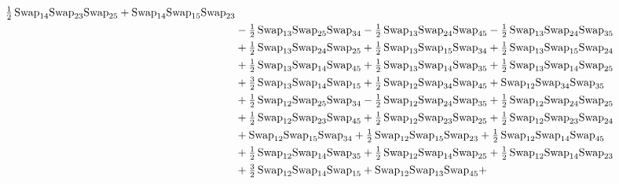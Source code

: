 \documentclass[12pt,dvipsnames,accepted=2016-08-18,a4paper,onecolumn]{quantumarticle}
\numberwithin{equation}{section}
\theoremstyle{definition}
\begin{document}
\begin{align*}
        \tfrac12\,\textnormal{Swap}_{14} \textnormal{Swap}_{23} \textnormal{Swap}_{25} + \textnormal{Swap}_{14} \textnormal{Swap}_{15} \textnormal{Swap}_{23} \\ & - \tfrac12\,\textnormal{Swap}_{13} \textnormal{Swap}_{25} \textnormal{Swap}_{34} - \tfrac12\,\textnormal{Swap}_{13} \textnormal{Swap}_{24} \textnormal{Swap}_{45} -
        \tfrac12\,\textnormal{Swap}_{13} \textnormal{Swap}_{24} \textnormal{Swap}_{35}\\ & + \tfrac12\,\textnormal{Swap}_{13} \textnormal{Swap}_{24} \textnormal{Swap}_{25} + \tfrac12\,\textnormal{Swap}_{13} \textnormal{Swap}_{15} \textnormal{Swap}_{34} + \tfrac12\,\textnormal{Swap}_{13} \textnormal{Swap}_{15} \textnormal{Swap}_{24}\\ & +
        \tfrac12\,\textnormal{Swap}_{13} \textnormal{Swap}_{14} \textnormal{Swap}_{45} + \tfrac12\,\textnormal{Swap}_{13} \textnormal{Swap}_{14} \textnormal{Swap}_{35} + \tfrac12\,\textnormal{Swap}_{13} \textnormal{Swap}_{14} \textnormal{Swap}_{25}\\ & + \tfrac32\,\textnormal{Swap}_{13} \textnormal{Swap}_{14} \textnormal{Swap}_{15} +
        \tfrac12\,\textnormal{Swap}_{12} \textnormal{Swap}_{34} \textnormal{Swap}_{45} + \textnormal{Swap}_{12} \textnormal{Swap}_{34} \textnormal{Swap}_{35}\\ & + \tfrac12\,\textnormal{Swap}_{12} \textnormal{Swap}_{25} \textnormal{Swap}_{34} - \tfrac12\,\textnormal{Swap}_{12} \textnormal{Swap}_{24} \textnormal{Swap}_{35} +
        \tfrac12\,\textnormal{Swap}_{12} \textnormal{Swap}_{24} \textnormal{Swap}_{25}\\ & + \tfrac12\,\textnormal{Swap}_{12} \textnormal{Swap}_{23} \textnormal{Swap}_{45} + \tfrac12\,\textnormal{Swap}_{12} \textnormal{Swap}_{23} \textnormal{Swap}_{25} + \tfrac12\,\textnormal{Swap}_{12} \textnormal{Swap}_{23} \textnormal{Swap}_{24}\\ & +
        \textnormal{Swap}_{12} \textnormal{Swap}_{15} \textnormal{Swap}_{34} + \tfrac12\,\textnormal{Swap}_{12} \textnormal{Swap}_{15} \textnormal{Swap}_{23} + \tfrac12\,\textnormal{Swap}_{12} \textnormal{Swap}_{14} \textnormal{Swap}_{45}\\ & + \tfrac12\,\textnormal{Swap}_{12} \textnormal{Swap}_{14} \textnormal{Swap}_{35} +
        \tfrac12\,\textnormal{Swap}_{12} \textnormal{Swap}_{14} \textnormal{Swap}_{25} + \tfrac12\,\textnormal{Swap}_{12} \textnormal{Swap}_{14} \textnormal{Swap}_{23}\\ & + \tfrac32\,\textnormal{Swap}_{12} \textnormal{Swap}_{14} \textnormal{Swap}_{15} + \textnormal{Swap}_{12} \textnormal{Swap}_{13} \textnormal{Swap}_{45} +

\end{align*}
\end{document}

